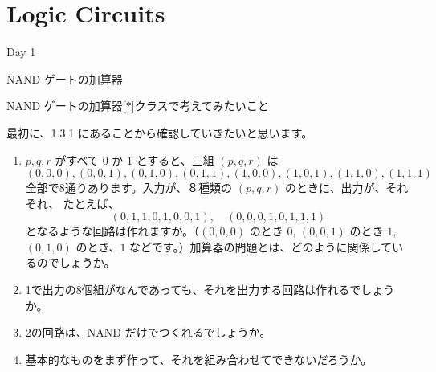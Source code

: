 \documentclass[10pt, dvipdfmx]{beamer}
\begin{document}
\section{Logic Circuits}
\begin{frame}{Day 1}
\begin{center}{\huge NAND ゲートの加算器}


\end{center}

\end{frame}

\begin{frame}{NAND ゲートの加算器\hfill[$\ast$]}{クラスで考えてみたいこと}

最初に、1.3.1 にあることから確認していきたいと思います。


\begin{enumerate}
\item  $p, q, r$ がすべて $0$ か $1$ とすると、三組 $(p,q,r)$ は
\[
(0,0,0), (0,0,1), (0,1,0), (0,1,1), (1,0,0), (1,0,1), (1,1,0), (1,1,1)
\]
全部で8通りあります。入力が、８種類の $(p,q,r)$  のときに、出力が、それぞれ、 たとえば、
\[
(0, 1, 1, 0, 1, 0, 0, 1), \quad (0,0,0,1,0,1,1,1)
\]
となるような回路は作れますか。（$(0,0,0)$ のとき $0$, $(0,0,1)$ のとき $1$,
$(0,1,0)$ のとき、$1$ などです。）加算器の問題とは、どのように関係しているのでしょうか。
\item  1で出力の8個組がなんであっても、それを出力する回路は作れるでしょうか。
\item 2の回路は、NAND だけでつくれるでしょうか。
\item  基本的なものをまず作って、それを組み合わせてできないだろうか。
\end{enumerate}
\end{frame}
\end{document}
